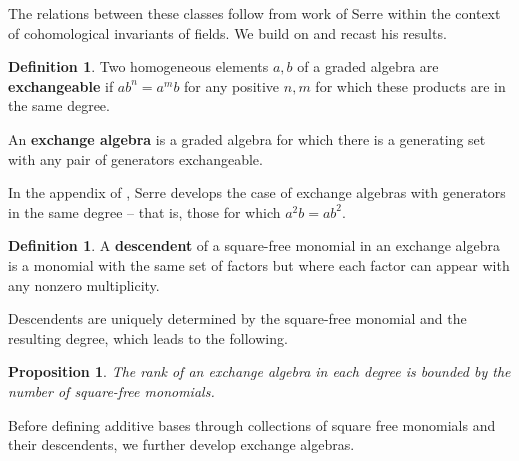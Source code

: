 \documentclass{article}
\theoremstyle{plain}
\newtheorem{proposition}[theorem]{Proposition}
\theoremstyle{definition}
\newtheorem{definition}[theorem]{Definition}
\newcommand{\dfh}[1]{ \color{blue} DFH: { #1} \color{black}}
\newcommand{\Z}{\mathbb{Z}}
\begin{document}
 The relations between these classes follow from work of Serre 
within the context of cohomological invariants
of fields.  We build on and 
recast his results.

\begin{definition}
    Two homogeneous elements $a,b$ of a graded algebra are {\bf exchangeable} if $ab^n = a^mb$ for any positive $n,m$ for which these products are in the same degree.

    An {\bf exchange algebra} is a graded algebra for which there
    is a generating set
    with any pair of generators  exchangeable.
\end{definition}

In the appendix of \cite{Serre24}, Serre develops the case of 
exchange algebras with generators in the same degree -- that is,
those for which $a^2b = ab^2$. \

\begin{definition}
    A {\bf descendent} of a square-free monomial in an exchange algebra is a monomial with the same set of factors but where each factor can appear with any nonzero multiplicity.
\end{definition}

Descendents are uniquely determined
by the square-free monomial and the resulting degree,
which leads to the following.

\begin{proposition}\label{bound}
    The rank of an exchange algebra in each degree is
    bounded by the number of square-free monomials.
\end{proposition}

Before defining additive bases through collections of square
free monomials and their descendents, we  further develop exchange algebras.
\end{document}
